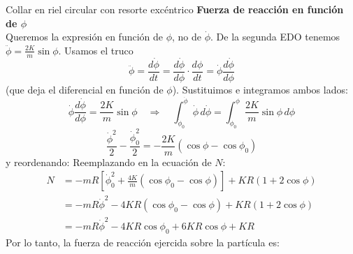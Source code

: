 \begin{solucion}{Collar en riel circular con resorte excéntrico}
\textbf{Fuerza de reacción en función de $\phi$}\\
Queremos la expresión en función de $\phi$, no de $\dot{\phi}$. De la segunda EDO tenemos $\ddot{\phi} = \frac{2K}{m} \sin\phi$. Usamos el truco
$$\ddot{\phi} = \frac{d\dot{\phi}}{dt} = \frac{d\dot{\phi}}{d\phi} \cdot \frac{d\phi}{dt} = \dot{\phi} \frac{d\dot{\phi}}{d\phi}$$
(que deja el diferencial en función de $\phi$). Sustituimos e integramos ambos lados:
$$\dot{\phi} \frac{d\dot{\phi}}{d\phi} = \frac{2K}{m} \sin\phi\quad\Longrightarrow\quad\int_{\dot{\phi}_0}^{\dot{\phi}} \dot{\phi} \, d\dot{\phi} = \int_{\phi_0}^{\phi} \frac{2K}{m} \sin\phi \, d\phi$$
$$\frac{\dot{\phi}^2}{2} - \frac{\dot{\phi}_0^2}{2} = -\frac{2K}{m} (\cos\phi - \cos\phi_0)$$
y reordenando:
Reemplazando en la ecuación de $N$:
\begin{align*}
N &= -mR\left[ \dot{\phi}^2_0 + \frac{4K}{m}(\cos \phi_0 - \cos \phi) \right] + KR(1 + 2\cos\phi) \\
  &= -mR\dot{\phi}^2 - 4KR(\cos \phi_0 - \cos \phi) + KR(1 + 2\cos\phi) \\
  &= -mR\dot{\phi}^2 - 4KR\cos \phi_0 + 6KR\cos \phi + KR
\end{align*}
Por lo tanto, la fuerza de reacción ejercida sobre la partícula es:

\end{solucion}
